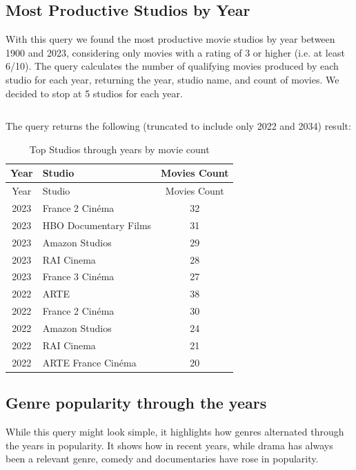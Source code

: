 \documentclass{Configuration_Files/PoliMi3i_thesis}
\begin{document}
\subsection{Most Productive Studios by Year}

With this query we found the most productive movie studios by year between 1900 and 2023, considering only movies with a rating of 3 or higher (i.e. at least 6/10). The query calculates the number of qualifying movies produced by each studio for each year, returning the year, studio name, and count of movies.
We decided to stop at 5 studios for each year.

\inputminted[frame=single,framesep=10pt,breaklines]{cypher}{letterboxd/queries/query4.cypher}

The query returns the following (truncated to include only 2022 and 2034) result:

\begin{longtable}[!h]{|c|l|c|}
\caption{Top Studios through years by movie count} \\
\hline
Year & Studio & Movies Count \\
\hline
\endfirsthead
\hline
Year & Studio & Movies Count \\
\hline
\endhead
\hline
\endfoot
\hline
\endlastfoot

2023 & France 2 Cinéma & 32 \\
2023 & HBO Documentary Films & 31 \\
2023 & Amazon Studios & 29 \\
2023 & RAI Cinema & 28 \\
2023 & France 3 Cinéma & 27 \\
2022 & ARTE & 38 \\
2022 & France 2 Cinéma & 30 \\
2022 & Amazon Studios & 24 \\
2022 & RAI Cinema & 21 \\
2022 & ARTE France Cinéma & 20 \\

\end{longtable}

\subsection{Genre popularity through the years}

While this query might look simple, it highlights how genres alternated through the years in popularity. It shows how in recent years, while drama has always been a relevant genre, comedy and documentaries have rose in popularity.
\end{document}
